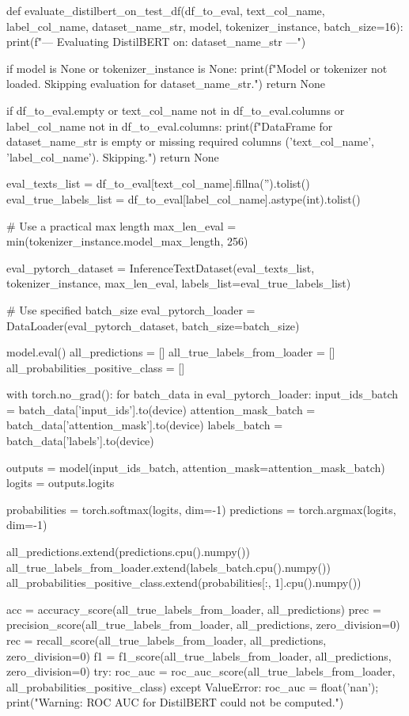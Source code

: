 \begin{ffcode}
def evaluate_distilbert_on_test_df(df_to_eval, text_col_name, label_col_name, dataset_name_str, model, tokenizer_instance, batch_size=16):
    print(f"\n--- Evaluating DistilBERT on: {dataset_name_str} ---")

    if model is None or tokenizer_instance is None:
        print(f"Model or tokenizer not loaded. Skipping evaluation for {dataset_name_str}.")
        return None

    if df_to_eval.empty or text_col_name not in df_to_eval.columns or label_col_name not in df_to_eval.columns:
        print(f"DataFrame for {dataset_name_str} is empty or missing required columns ('{text_col_name}', '{label_col_name}'). Skipping.")
        return None

    eval_texts_list = df_to_eval[text_col_name].fillna('').tolist()
    eval_true_labels_list = df_to_eval[label_col_name].astype(int).tolist()

    # Use a practical max length
    max_len_eval = min(tokenizer_instance.model_max_length, 256)

    eval_pytorch_dataset = InferenceTextDataset(eval_texts_list, tokenizer_instance, max_len_eval, labels_list=eval_true_labels_list)

    # Use specified batch_size
    eval_pytorch_loader = DataLoader(eval_pytorch_dataset, batch_size=batch_size)

    model.eval()
    all_predictions = []
    all_true_labels_from_loader = []
    all_probabilities_positive_class = []

    with torch.no_grad():
        for batch_data in eval_pytorch_loader:
            input_ids_batch = batch_data['input_ids'].to(device)
            attention_mask_batch = batch_data['attention_mask'].to(device)
            labels_batch = batch_data['labels'].to(device)

            outputs = model(input_ids_batch, attention_mask=attention_mask_batch)
            logits = outputs.logits

            probabilities = torch.softmax(logits, dim=-1)
            predictions = torch.argmax(logits, dim=-1)

            all_predictions.extend(predictions.cpu().numpy())
            all_true_labels_from_loader.extend(labels_batch.cpu().numpy())
            all_probabilities_positive_class.extend(probabilities[:, 1].cpu().numpy())

    acc = accuracy_score(all_true_labels_from_loader, all_predictions)
    prec = precision_score(all_true_labels_from_loader, all_predictions, zero_division=0)
    rec = recall_score(all_true_labels_from_loader, all_predictions, zero_division=0)
    f1 = f1_score(all_true_labels_from_loader, all_predictions, zero_division=0)
    try: roc_auc = roc_auc_score(all_true_labels_from_loader, all_probabilities_positive_class)
    except ValueError: roc_auc = float('nan'); print("Warning: ROC AUC for DistilBERT could not be computed.")


\end{ffcode}
